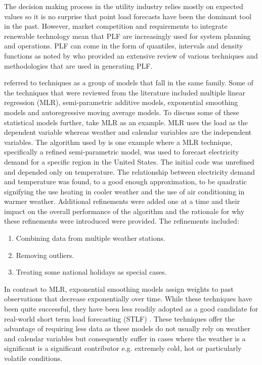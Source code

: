 \documentclass[a4paper]{article}
\begin{document}
The decision making process in the utility industry relies mostly on expected values so it is no surprise that point load forecasts have been the dominant tool in the past. However, market competition and requirements to integrate renewable technology mean that PLF are increasingly used for system planning and operations. PLF can come in the form of quantiles, intervals and density functions as noted by \citet{hong16} who provided an extensive review of various techniques and methodologies that are used in generating PLF. 

\citet{hong16} referred to techniques as a group of models that fall in the same family. Some of the techniques that were reviewed from the literature included multiple linear regression (MLR), semi-parametric additive models, exponential smoothing models and autoregressive moving average models. To discuss some of these statistical models further, take MLR as an example. MLR uses the load as the dependent variable whereas weather and calendar variables are the independent variables. The algorithm used by \citet{char14} is one example where a MLR technique, specifically a refined semi-parametric model, was used to forecast electricity demand for a specific region in the United States. The initial code was unrefined and depended only on temperature. The relationship between electricity demand and temperature was found, to a good enough approximation, to be quadratic signifying the use heating in cooler weather and the use of air conditioning in warmer weather. Additional refinements were added one at a time and their impact on the overall performance of the algorithm and the rationale for why these refinements were introduced were provided. The refinements included:
\begin{enumerate}
\item Combining data from multiple weather stations.
\item Removing outliers.
\item Treating some national holidays as special cases.
\end{enumerate}

In contrast to MLR, exponential smoothing models assign weights to past observations that decrease exponentially over time. While these techniques have been quite successful, they have been less readily adopted as a good candidate for real-world short term load forecasting (STLF) \citep{hong16}. These techniques offer the advantage of requiring less data as these models do not usually rely on weather and calendar variables but consequently suffer in cases where the weather is a significant is a significant contributor e.g. extremely cold, hot or particularly volatile conditions.
\end{document}
